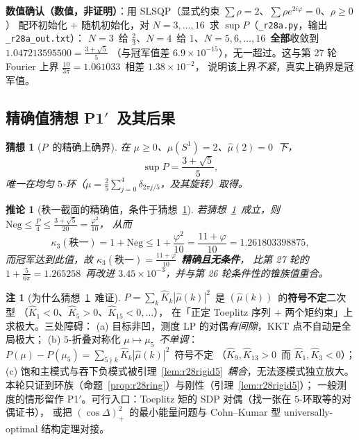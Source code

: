 \documentclass[UTF8,11pt]{ctexart}
\newtheorem{corollary}[theorem]{推论}
\newtheorem{conjecture}[theorem]{猜想}
\theoremstyle{definition}
\newtheorem{remark}[theorem]{注}
\begin{document}
\textbf{数值确认（数值，非证明）}：用 SLSQP（显式约束 $\sum\rho=2$、$\sum\rho e^{2i\varphi}=0$、$\rho\ge0$）
配环初始化 $+$ 随机初始化，对 $N=3,\dots,16$~求 $\sup P$（\texttt{\_r28a.py}，输出 \texttt{\_r28a\_out.txt}）：
$N=3$~给 $\frac23$、$N=4$~给 $1$、$N=5,6,\dots,16$~\textbf{全部}收敛到 $1.047213595500=\frac{3+\sqrt5}5$
（与冠军值差 $6.9\times10^{-15}$），无一超过。这与第 27 轮 Fourier 上界 $\frac{10}{3\pi}=1.061033$~相差 $1.38\times10^{-2}$，
说明该上界\emph{不紧}，真实上确界是冠军值。

\subsection{精确值猜想 P1$'$~及其后果}\label{sec:r28:conj}

\begin{conjecture}[$P$~的精确上确界]\label{conj:r28P}
在 $\mu\ge0$、$\mu(S^1)=2$、$\widehat\mu(2)=0$~下，
\[
\sup P=\frac{3+\sqrt5}5,
\]
唯一在均匀 $5$-环（$\mu=\frac25\sum_{j=0}^4\delta_{2\pi j/5}$，及其旋转）取得。
\end{conjecture}

\begin{corollary}[秩一截面的精确值，条件于猜想~\ref{conj:r28P}]\label{cor:r28exact}
若猜想~\ref{conj:r28P}~成立，则 $\mathrm{Neg}\le\frac P4\le\frac{3+\sqrt5}{20}=\frac{\varphi^2}{10}$，
从而
\[
\kappa_3(\text{秩一})=1+\mathrm{Neg}\le1+\frac{\varphi^2}{10}=\frac{11+\varphi}{10}=1.261803398875,
\]
而冠军\emph{达到}此值，故 $\kappa_3(\text{秩一})=\frac{11+\varphi}{10}$~\textbf{精确且无条件}，
比第 27 轮的 $1+\frac5{6\pi}=1.265258$~再改进 $3.45\times10^{-3}$，并与第 26 轮\emph{条件性}的锥族值重合。
\end{corollary}

\begin{remark}[为什么猜想~\ref{conj:r28P}~难证]\label{rem:r28hard}
$P=\sum_k\widehat K_k|\widehat\mu(k)|^2$~是 $(\widehat\mu(k))$~的\textbf{符号不定}二次型
（$\widehat K_1<0$、$\widehat K_5>0$、$\widehat K_{15}<0,\dots$），
在「正定 Toeplitz 序列 $+$ 两个矩约束」上求极大。三处障碍：
(a) 目标非凹，测度 LP 的对偶\emph{有间隙}，KKT 点不自动是全局极大；
(b) $5$-折叠对称化 $\mu\mapsto\mu_5$~\emph{不单调}：
$P(\mu)-P(\mu_5)=\sum_{5\nmid k}\widehat K_k|\widehat\mu(k)|^2$~符号不定
（$\widehat K_9,\widehat K_{13}>0$~而 $\widehat K_1,\widehat K_3<0$）；
(c) 饱和主模式与吞下负模式被引理~\ref{lem:r28rigid5}~\emph{耦合}，无法逐模式独立放大。
本轮只证到环族（命题~\ref{prop:r28ring}）与刚性（引理~\ref{lem:r28rigid5}）；
一般测度的情形留作 P1$'$。可行入口：Toeplitz 矩的 SDP 对偶（找一张在 $5$-环取等的对偶证书），
或把 $(\cos\Delta)_+^2$~的最小能量问题与 Cohn--Kumar 型 universally-optimal 结构定理对接。
\end{remark}
\end{document}
